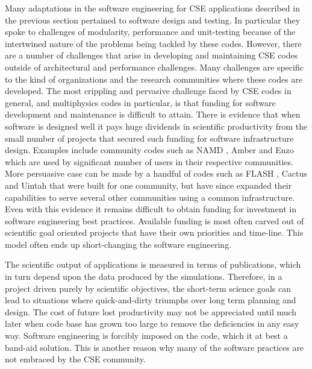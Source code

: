 
\label{sec:institutional-challenges}
Many adaptations in the software engineering for CSE applications described in the previous
section pertained to software design and testing. In particular they
spoke to challenges of modularity, performance and unit-testing because of the
intertwined nature of the problems being tackled by these
codes. However, there are a number of challenges that arise in developing and maintaining CSE codes outside of architectural and performance challenges.  Many challenges are specific to the kind of organizations and the research communities
where these codes are developed. The most crippling and pervasive
challenge faced by CSE codes in general, and multiphysics codes in
particular, is that funding for software development and maintenance is difficult to attain. 
There is evidence that when software is designed well
it pays huge dividends in scientific productivity from the
small number of projects that secured such funding for software
infrastructure design. Examples include community codes such as NAMD
\cite{phillips2005scalable}, Amber \cite{case2014amber} and Enzo \cite{Enzo2013} which are used by
significant number of users in their respective communities. More
persuasive case can be made by a handful of codes such as FLASH \cite{Dubey2009, Dubey2008},
Cactus \cite{blazewiczphysics} and Uintah \cite{uintah2,TGRID10} that were built for one community,
but have since expanded their capabilities to serve several other
communities using a common infrastructure.
Even with this evidence it remains difficult to obtain
funding for investment in software engineering best practices.
Available funding is most often carved out of scientific goal 
oriented projects that have their own priorities and time-line. This
model often ends up short-changing the software engineering.


The scientific output of applications is measured in terms of publications, which in
turn depend upon the data produced by the simulations. Therefore, in a
project driven purely by scientific objectives, the short-term science
goals can lead to situations where quick-and-dirty triumphs over
long term planning and design.
The cost of future lost productivity may not be appreciated until much
later when code base has  grown too large to remove the deficiencies
in any easy way.  Software engineering is forcibly imposed on the
code, which it at best a band-aid solution. This is another reason why
many of the software practices are not embraced by the CSE community.  

